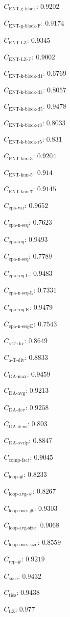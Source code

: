 \documentclass[a4paper]{article}
\newcommand{\daavgname}{\text{DA-avg}}
\newcommand{\daavg}{C_{\daavgname}}
\newcommand{\damaxname}{\text{DA-max}}
\newcommand{\damax}{C_{\damaxname}}
\newcommand{\dadevname}{\text{DA-dev}}
\newcommand{\dadev}{C_{\dadevname}}
\newcommand{\dadensname}{\text{DA-dens}}
\newcommand{\dadens}{C_{\dadensname}}
\newcommand{\daoverlapname}{\text{DA-ovrlp}}
\newcommand{\daoverlap}{C_{\daoverlapname}}
\newcommand{\complexityfactorname}{\text{comp-fact}}
\newcommand{\complexityfactor}{C_{\complexityfactorname}}
\newcommand{\simpletracedivname}{\text{s-T-div}}
\newcommand{\simpletracediv}{C_{\simpletracedivname}}
\newcommand{\advtracedivname}{\text{a-T-div}}
\newcommand{\advtracediv}{C_{\advtracedivname}}
\newcommand{\loopnumname}{\text{loop-\#}}
\newcommand{\loopnum}{C_{\loopnumname}}
\newcommand{\loopavgname}{\text{loop-avg-\#}}
\newcommand{\loopavg}{C_{\loopavgname}}
\newcommand{\loopmaxname}{\text{loop-max-\#}}
\newcommand{\loopmax}{C_{\loopmaxname}}
\newcommand{\loopavgsizename}{\text{loop-avg-size}}
\newcommand{\loopavgsize}{C_{\loopavgsizename}}
\newcommand{\loopmaxsizename}{\text{loop-max-size}}
\newcommand{\loopmaxsize}{C_{\loopmaxsizename}}
\newcommand{\repnumname}{\text{rep-\#}}
\newcommand{\repnum}{C_{\repnumname}}
\newcommand{\numberofneighborhoodsname}{\text{succ}}
\newcommand{\numberofneighborhoods}{C_{\numberofneighborhoodsname}}
\newcommand{\numberoftiesname}{\text{ties}}
\newcommand{\numberofties}{C_{\numberoftiesname}}
\newcommand{\lempelzivname}{\text{LZ}}
\newcommand{\lempelziv}{C_{\lempelzivname}}
\newcommand{\entgblockname}{\text{ENT-g-block}}
\newcommand{\entgblock}{C_{\entgblockname}}
\newcommand{\entgblockflatname}{\text{ENT-g-block-F}}
\newcommand{\entgblockflat}{C_{\entgblockflatname}}
\newcommand{\entlempelzivname}{\text{ENT-LZ}}
\newcommand{\entlempelziv}{C_{\entlempelzivname}}
\newcommand{\entlempelzivflatname}{\text{ENT-LZ-F}}
\newcommand{\entlempelzivflat}{C_{\entlempelzivflatname}}
\newcommand{\entkblockdonename}{\text{ENT-k-block-d1}}
\newcommand{\entkblockdone}{C_{\entkblockdonename}}
\newcommand{\entkblockdthreename}{\text{ENT-k-block-d3}}
\newcommand{\entkblockdthree}{C_{\entkblockdthreename}}
\newcommand{\entkblockdfivename}{\text{ENT-k-block-d5}}
\newcommand{\entkblockdfive}{C_{\entkblockdfivename}}
\newcommand{\entkblockrthreename}{\text{ENT-k-block-r3}}
\newcommand{\entkblockrthree}{C_{\entkblockrthreename}}
\newcommand{\entkblockrfivename}{\text{ENT-k-block-r5}}
\newcommand{\entkblockrfive}{C_{\entkblockrfivename}}
\newcommand{\entknnthreename}{\text{ENT-knn-3}}
\newcommand{\entknnthree}{C_{\entknnthreename}}
\newcommand{\entknnfivename}{\text{ENT-knn-5}}
\newcommand{\entknnfive}{C_{\entknnfivename}}
\newcommand{\entknnsevenname}{\text{ENT-knn-7}}
\newcommand{\entknnseven}{C_{\entknnsevenname}}
\newcommand{\epavariantname}{\text{epa-var}}
\newcommand{\epavariant}{C_{\epavariantname}}
\newcommand{\epanormvariant}{C_{\epanormsequencename}}
\newcommand{\epasequencename}{\text{epa-seq}}
\newcommand{\epasequence}{C_{\epasequencename}}
\newcommand{\epanormsequencename}{\text{epa-n-seq}}
\newcommand{\epanormsequence}{C_{\epanormsequencename}}
\newcommand{\epasequencelname}{\text{epa-seq-L}}
\newcommand{\epasequencel}{C_{\epasequencelname}}
\newcommand{\epanormsequencelname}{\text{epa-n-seq-L}}
\newcommand{\epanormsequencel}{C_{\epanormsequencelname}}
\newcommand{\epasequenceename}{\text{epa-seq-E}}
\newcommand{\epasequencee}{C_{\epasequenceename}}
\newcommand{\epanormsequenceename}{\text{epa-n-seq-E}}
\newcommand{\epanormsequencee}{C_{\epanormsequenceename}}
\begin{document}
\begin{compactitem}
\item $\entgblock$: $0.9202$
\item $\entgblockflat$: $0.9174$
\item $\entlempelziv$: $0.9345$
\item $\entlempelzivflat$: $0.9002$
\item $\entkblockdone$: $0.6769$
\item $\entkblockdthree$: $0.8057$
\item $\entkblockdfive$: $0.9478$
\item $\entkblockrthree$: $0.8033$
\item $\entkblockrfive$: $0.831$
\item $\entknnthree$: $0.9204$
\item $\entknnfive$: $0.914$
\item $\entknnseven$: $0.9145$
\item $\epavariant$: $0.9652$
\item $\epanormvariant$: $0.7623$
\item $\epasequence$: $0.9493$
\item $\epanormsequence$: $0.7789$
\item $\epasequencel$: $0.9483$
\item $\epanormsequencel$: $0.7331$
\item $\epasequencee$: $0.9479$
\item $\epanormsequencee$: $0.7543$
\item $\simpletracediv$: $0.8649$
\item $\advtracediv$: $0.8833$
\item $\damax$: $0.9459$
\item $\daavg$: $0.9213$
\item $\dadev$: $0.9258$
\item $\dadens$: $0.803$
\item $\daoverlap$: $0.8847$
\item $\complexityfactor$: $0.9045$
\item $\loopnum$: $0.8233$
\item $\loopavg$: $0.8267$
\item $\loopmax$: $0.9303$
\item $\loopavgsize$: $0.9068$
\item $\loopmaxsize$: $0.8559$
\item $\repnum$: $0.9219$
\item $\numberofneighborhoods$: $0.9432$
\item $\numberofties$: $0.9438$
\item $\lempelziv$: $0.977$

\end{compactitem}
\end{document}
